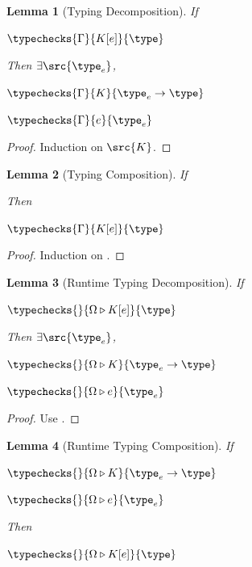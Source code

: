\documentclass[a4paper,names,dvipsnames]{article}
\newtheorem{lemma}{Lemma}
\begin{document}
\begin{lemma}[Typing Decomposition]\label{lem:ctxtyping:plugged}
  If
  \begin{assumptions}
    \item $\typechecks{\Gamma}{K[e]}{\type}$
  \end{assumptions}
  Then $\exists \src{\type_{e}}$,
  \begin{goals}
    \item $\typechecks{\Gamma}{K}{\type_{e}\to\type}$
    \item $\typechecks{\Gamma}{e}{\type_{e}}$
  \end{goals}
\end{lemma}
\begin{proof}
  Induction on $\src{K}$.
\end{proof}
\begin{lemma}[Typing Composition]\label{lem:ctxtyping:compos}
  If
  Then
  \begin{goals}
    \item $\typechecks{\Gamma}{K[e]}{\type}$
  \end{goals}
\end{lemma}
\begin{proof}
  Induction on .
\end{proof}
\begin{lemma}[Runtime Typing Decomposition]\label{lem:rtctxtyping:plugged}
  If
  \begin{assumptions}
    \item $\typechecks{}{\Omega \triangleright K[e]}{\type}$
  \end{assumptions}
  Then $\exists \src{\type_{e}}$,
  \begin{goals}
    \item $\typechecks{}{\Omega \triangleright K}{\type_{e}\to\type}$
    \item $\typechecks{}{\Omega \triangleright e}{\type_{e}}$
  \end{goals}
\end{lemma}
\begin{proof}
  Use .
\end{proof}
\begin{lemma}[Runtime Typing Composition]\label{lem:rtctxtyping:compos}
  If
  \begin{assumptions}
    \item $\typechecks{}{\Omega \triangleright K}{\type_{e}\to\type}$
    \item $\typechecks{}{\Omega \triangleright e}{\type_{e}}$
  \end{assumptions}
  Then
  \begin{goals}
    \item $\typechecks{}{\Omega \triangleright K[e]}{\type}$
  \end{goals}
\end{lemma}
\end{document}
